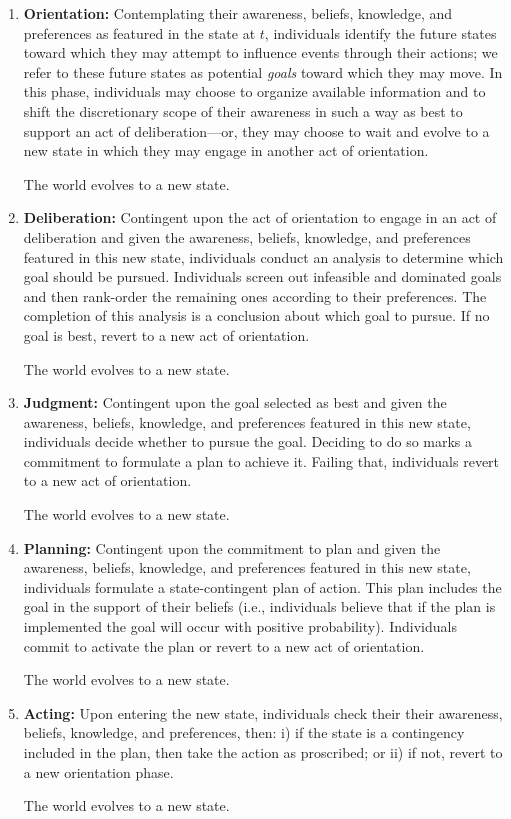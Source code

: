 \documentclass[
11pt,
titlepage,
reqno,
]{article}%
\theoremstyle{definition}
\begin{document}
\begin{enumerate}
	\item \textbf{Orientation:} Contemplating their awareness, beliefs, knowledge, and preferences as featured in the state at $t$, individuals identify the future states toward which they may attempt to influence events through their actions; we refer to these future states as potential \textit{goals} toward which they may move. In this phase, individuals may choose to organize  available information and to shift the discretionary scope of their awareness in such a way as best to support an act of deliberation---or, they may choose to wait and evolve to a new state in which they may engage in another act of orientation.
	
	The world evolves to a new state.
	\item \textbf{Deliberation:} Contingent upon the act of orientation to engage in an act of deliberation and given the awareness, beliefs, knowledge, and preferences featured in this new state, individuals conduct an analysis to determine which goal should be pursued. Individuals screen out infeasible and dominated goals and then rank-order the remaining ones according to their preferences. The completion of this analysis is a conclusion about which goal to pursue. If no goal is best, revert to a new act of orientation.
	
	The world evolves to a new state.
	
	\item \textbf{Judgment:} Contingent upon the goal selected as best and given the awareness, beliefs, knowledge, and preferences featured in this new state, individuals decide whether to pursue the goal. Deciding to do so marks a commitment to formulate a plan to achieve it. Failing  that, individuals revert to a new act of orientation.
	
	The world evolves to a new state.
	
	\item \textbf{Planning:} Contingent upon the commitment to plan and given the awareness, beliefs, knowledge, and preferences featured in this new state, individuals  formulate a state-contingent plan of action. This plan includes the goal in the support of their beliefs (i.e., individuals believe that if the plan is implemented the goal will occur with positive probability). Individuals commit to activate the plan or revert to a  new act of orientation.
	
	The world evolves to a new state.
	
	\item \textbf{Acting:} Upon entering the new state, individuals check their their awareness, beliefs, knowledge, and preferences, then: i) if the state is a contingency included in the plan, then take the action as proscribed; or ii) if not, revert to a new orientation phase.
	
	The world evolves to a new state.
\end{enumerate}
\end{document}
